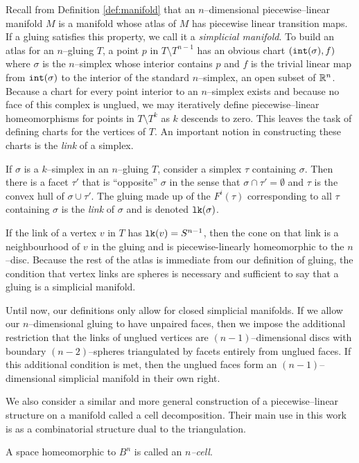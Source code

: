 Recall from Definition \ref{def:manifold} that an $n$--dimensional piecewise--linear manifold $M$ is a manifold whose atlas of $M$ has piecewise linear transition maps.
If a gluing satisfies this property, we call it a \emph{simplicial manifold}.
To build an atlas for an $n$--gluing $T$, a point $p$ in $T\setminus T^{n-1}$ has an obvious chart $(\mathtt{int}(\sigma),f)$ where $\sigma$ is the $n$--simplex whose interior contains $p$ and $f$ is the trivial linear map from $\mathtt{int}(\sigma)$ to the interior of the standard $n$--simplex, an open subset of $\mathbb{R}^n$.
Because a chart for every point interior to an $n$--simplex exists and because no face of this complex is unglued, we may iteratively define piecewise--linear homeomorphisms for points in $T\setminus T^{k}$ as $k$ descends to zero.
This leaves the task of defining charts for the vertices of $T$.
An important notion in constructing these charts is the \emph{link} of a simplex.

\begin{defn}
  If $\sigma$ is a $k$--simplex in an $n$--gluing $T$, consider a simplex $\tau$ containing $\sigma$.  
  Then there is a facet $\tau'$ that is ``opposite'' $\sigma$ in the sense that $\sigma\cap \tau'=\emptyset$ and $\tau$ is the convex hull of $\sigma\cup \tau'$.
  The gluing made up of the $F^i(\tau)$ corresponding to all $\tau$ containing $\sigma$ is the \emph{link} of $\sigma$ and is denoted $\texttt{lk}(\sigma)$.
\end{defn}

If the link of a vertex $v$ in $T$ has $\texttt{lk}(v)=S^{n-1}$, then the cone on that link is a neighbourhood of $v$ in the gluing and is piecewise-linearly homeomorphic to the $n$--disc.
Because the rest of the atlas is immediate from our definition of gluing, the condition that vertex links are spheres is necessary and sufficient to say that a gluing is a simplicial manifold.

Until now, our definitions only allow for closed simplicial manifolds.
If we allow our $n$--dimensional gluing to have unpaired faces, then we impose the additional restriction that the links of unglued vertices are $(n-1)$--dimensional discs with boundary $(n-2)$--spheres triangulated by facets entirely from unglued faces.
If this additional condition is met, then the unglued faces form an $(n-1)$--dimensional simplicial manifold in their own right.

We also consider a similar and more general construction of a piecewise--linear structure on a manifold called a cell decomposition.
Their main use in this work is as a combinatorial structure dual to the triangulation.

\begin{defn}
  A space homeomorphic to $B^n$ is called an \emph{$n$--cell}.
\end{defn}





